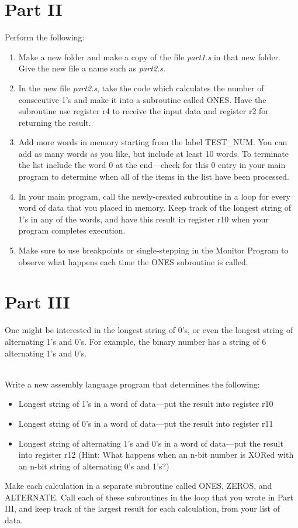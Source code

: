 \documentclass[epsfig,10pt,fullpage]{article}
\begin{document}
\section*{Part II}
Perform the following:
\begin{enumerate}
\item Make a new folder and make a copy of the file {\it part1.s} in that new folder. Give
the new file a name such as {\it part2.s}.
\item In the new file {\it part2.s}, take the code which calculates the 
number of consecutive 1's and make it into a subroutine called ONES. Have the subroutine use 
register r4 to receive the input data and register r2 for returning the result.
\item Add more words in memory starting from the label TEST\_NUM. You can add as many
words as you like, but include at least 10 words. To terminate the list include the word 0
at the end---check for this 0 entry in your main program to determine when all of the
items in the list have been processed.
\item In your main program, call the newly-created subroutine in a loop for every word of 
data that you placed in memory. Keep track of the longest string of 1's in any of the words, 
and have this result in register r10 when your program completes execution. 
\item Make sure to use breakpoints or single-stepping in the Monitor Program to observe what 
happens each time the ONES subroutine is called.
\end{enumerate}

\section*{Part III}
One might be interested in the longest string of 0's, or even the longest string of
alternating 1's and 0's. For example, the binary number {} has a string of 
6 alternating 1's and 0's.

~\\
 Write a new assembly language program that determines the following:
\begin{itemize}
\item Longest string of 1's in a word of data---put the result into register r10
\item Longest string of 0's in a word of data---put the result into register r11
\item Longest string of alternating 1's and 0's in a word of data---put the result into 
register r12
(Hint: What happens when an n-bit number is XORed with an n-bit string of alternating 0's and 1's?)
\end{itemize}
Make each calculation in a separate subroutine called ONES, ZEROS, and ALTERNATE. Call
each of these subroutines in the loop that you wrote in Part III, and keep track of the
largest result for each calculation, from your list of data.
\end{document}
